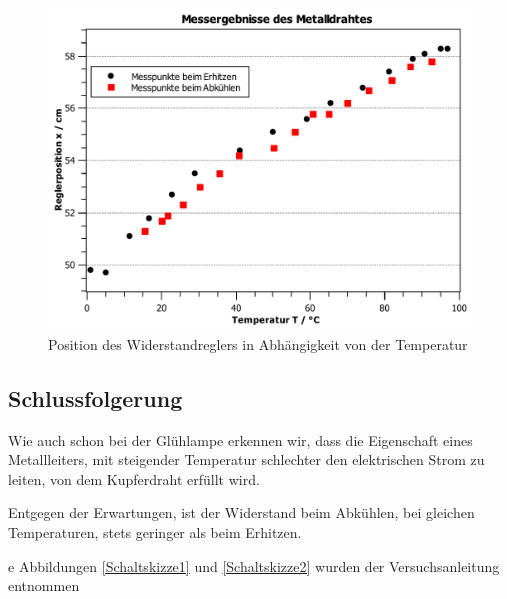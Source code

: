 \documentclass[11pt,a4paper,titlepage, ngerman]{article}
\begin{document}
				\begin{figure}
				\centering
				\includegraphics[width=\textwidth]{MessungDraht.pdf}
				\caption{Position des Widerstandreglers in Abhängigkeit von der Temperatur}
				\label{Ölbad}
			\end{figure}
			
		\subsection{Schlussfolgerung}	
			
			Wie auch schon bei der Glühlampe erkennen wir, dass die Eigenschaft eines Metallleiters, mit steigender Temperatur schlechter den elektrischen Strom zu leiten, von dem Kupferdraht erfüllt wird.
			
			Entgegen der Erwartungen, ist der Widerstand beim Abkühlen, bei gleichen Temperaturen, stets geringer als beim Erhitzen. %
		
	\begin{thebibliography}	
		e Abbildungen \ref{Schaltskizze1} und \ref{Schaltskizze2} wurden der Versuchsanleitung entnommen
	\end{thebibliography}	
			
\end{document}
